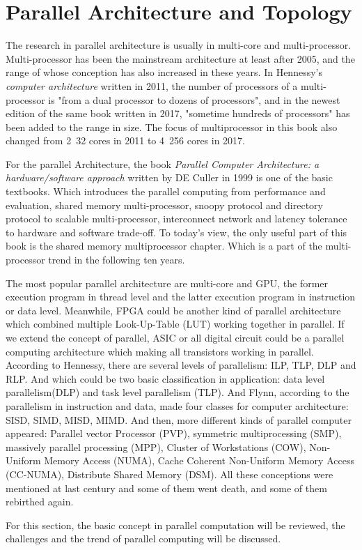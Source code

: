 \section{Parallel Architecture and Topology}
\par The research in parallel architecture is usually in multi-core and multi-processor. Multi-processor has been the mainstream architecture at least after 2005, and the range of whose conception has also increased in these years. In Hennessy's \textit{computer architecture}\cite{hennessy2011computer} written in 2011, the number of processors of a multi-processor is "from a dual processor to dozens of processors", and in the newest edition of the same book written in 2017\cite{hennessy2017computer}, "sometime hundreds of processors" has been added to the range in size. The focus of multiprocessor in this book also changed from 2~32 cores in 2011 to 4~256 cores in 2017.
\par For the parallel Architecture, the book \textit{Parallel Computer Architecture: a hardware/software approach}\cite{culler1999parallel} written by DE Culler in 1999 is one of the basic textbooks. Which introduces the parallel computing from performance and evaluation, shared memory multi-processor, snoopy protocol and directory protocol to scalable multi-processor, interconnect network and latency tolerance to hardware and software trade-off. To today's view, the only useful part of this book is the shared memory multiprocessor chapter. Which is a part of the multi-processor trend in the following ten years.
\par The most popular parallel architecture are multi-core and GPU, the former execution program in thread level and the latter execution program in instruction or data level. Meanwhile, FPGA could be another kind of parallel architecture which combined multiple Look-Up-Table (LUT) working together in parallel. If we extend the concept of parallel, ASIC or all digital circuit could be a parallel computing architecture which making all transistors working in parallel. According to Hennessy\cite{hennessy2017computer}, there are several levels of parallelism: ILP, TLP, DLP and RLP. And which could be two basic classification in application: data level parallelism(DLP) and task level parallelism (TLP). And Flynn, according to the parallelism in instruction and data, made four classes for computer architecture: SISD, SIMD, MISD, MIMD\cite{flynn1966very}. And then, more different kinds of parallel computer appeared: Parallel vector Processor (PVP), symmetric multiprocessing (SMP), massively parallel processing (MPP), Cluster of Workstations (COW), Non-Uniform Memory Access (NUMA), Cache Coherent Non-Uniform Memory Access (CC-NUMA), Distribute Shared Memory (DSM). All these conceptions were mentioned at last century and some of them went death, and some of them rebirthed again.
\par For this section, the basic concept in parallel computation will be reviewed, the challenges and the trend of parallel computing will be discussed. 
